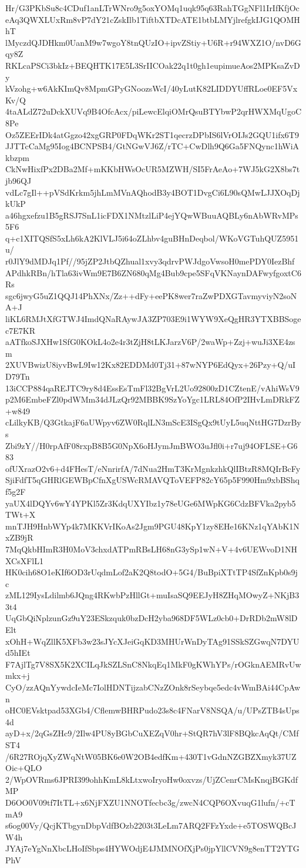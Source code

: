 Hr/G3PKbSu8c4CDuf1anLTrWNro9g5oxYOMq1uqk95q63RahTGgNFl1IrIfKfjOc
eAq3QWXLUxRm8vP7dY21cZskIlb1TiftbXTDcATE1btbLMYjlrefgkIJG1QOMHhT
lMyczdQJDHkm0UanM9w7wgoY8tnQUzIO+ipvZStiy+U6R+r94WXZ1O/nvD6Gqy8Z
RKLcaPSCi3bkIz+BEQHTK17E5L3SrIICOak22q1t0gh1eupimueAos2MPKsaZvDy
kVzohg+w6AkKImQv8MpmGPyGNoozsWcI/40yLutK82LIDDYUffRLoe0EF5VxKv/Q
4taALdZ72uDckXUVq9B4OfcAcx/piLewcElqiOMrQsuBTYbwP2qrHWXMqUgoC8Pe
Oz5ZEErIDk4atGgzo42xgGRP0FDqWKr2ST1qecrzDPbIS6lVrOIJs2GQU1ifx6T9
JJTTcCaMg95Iog4BCNPSB4/GtNGwVJ6Z/rTC+CwDlh9Q6Ga5FNQync1hWiAkbzpm
CkNwHixfPx2DBa2Mf+mKKbHWsOcUR5MZWH/SI5FrAeAo+7WJ5kG2X8bs7tjb96QJ
vdLc7gIl++pVSdKrkm5jhLmMVnAQhodB3y4BOT1DvgCi6L90sQMwLJJXOqDjkUkP
a46hgxefzu1B5gRSJ7SnL1icFDX1NMtzlLiP4ejYQwWBuuAQBLy6nAbWRvMPs5F6
q+c1XITQSfS5xLh6kA2KlVLJ5i64oZLhbv4guBHnDeqbol/WKoVGTuhQUZ5951u/
r0JlY9dMDJq1Pf//95jZP2JtbQZhual1xvy3qdrvPWJdgoVwsoH0mePDY0IezBhf
APdhkRBn/hTla63ivWm9E7B6ZN680qMg4Bub9cpe5SFqVKNaynDAFwyfgoxtC6Rs
sgc6jwyG5uZ1QQJ14PhXNx/Zz++dFy+eePK8wer7raZwPDXGTavmyviyN2soNA+J
liKL6RMJtXfGTWJ4ImdQNaRAywJA3ZP703E9i1WYW9XeQgHR3YTXBBSogec7E7KR
aATfkoSJXHw1SfG0KOkL4o2e4r3tZjH8tLKJarzV6P/2waWp+Zzj+wuJi3XE4zsm
2XUVBwizU8iyvBwL9Iw12Kx82EDDMd0Tj31+87wNYP6EdQyx+26Pzy+Q/uID79Tn
13iCCP884qaREJTC9ry8d4EssEsTmFl32BgVrL2Uo92800zD1CZtenE/vAhiWsV9
p2M6EmbeFZl0pdWMm34dJLzQr92MBBK9SzYoYgc1LRL84OfP2IHvLmDRkFZ+w849
cLilkyKB/Q3GtkajF6aUWpyv6ZW0RqlLN3mScE3ISgQx9tUyL5uqNttHG7DzrBys
Zbi9zY//H0rpAfF08rxpB8B5G0NpX6oHJymJmBWO3uJfl0i+r7uj94OFLSE+G683
ofUXrazO2v6+d4FHesT/eNnrirfA/7dNua2HmT3KrMgnkzhkQlIBtzR8MQIrBcFy
SjiFdfT5qGHRlGEWBpCfnXgUSWcRMAVQToVEFP82cY65p5F990Hm9xbBShqf5g2F
yaUX4lDQYv6wY4YPKl5Zr3KdqUXYIbz1y78eUGe6MWpKG6CdzBFVka2pyb5TWt+X
mnTJH9HnbWYp4k7MKKVrIKoAs2Jgm9PGU48KpY1zy8EHe16KNz1qYAbK1NxZB9jR
7MqQkbHImR3H0MoV3chxdATPmRBsLH68nG3ySp1wN+V+4v6UEWvoD1NHXCsXFlL1
HK0cih68O1eKIf6OD3rUqdmLof2aK2Q8todO+5G4/BuBpiXTtTP4SfZnKpb0s9jc
zML129IysLdilmb6JQng4RKwbPzHllGt+muIsaSQ9EEJyH8ZHqMOwyZ+NKjB33t4
UqGbQiNplzunGz9uY23ESkzquk0bzDcH2yba968DF5WLz0cb0+DrRDb2mW8lDElt
xOhH+WqZllK5XFb3w23sJYcXJeiGqKD3MHUrWnDyTAg91SSkSZGwqN7DYUd5hIEt
F7AjlTg7V8SX5K2XCILqJkSZLSnC8NkqEq1MkF0gKWhYPs/rOGknAEMRvUwmkx+j
CyO/zzAQnYywdcIeMc7IolHDNTijzabCNzZOnk8rSeybqe5edc4vWmBAi44CpAwn
oHC0EVsktpad53XGb4/CflemwBHRPudo23s8c4FNarV8NSQA/u/UPsZTB4sUps4d
ayD+x/2qGsZHc9/2Ilw4PU8yBGbCuXEZqV0hr+StQR7hV3lF8BQkcAqQt/CMfST4
/6R27ROjqXyZWqNtW05BK6e0W2OB4edfKm+430T1vGdnNZGBZXmyk37UZOic+QLO
2/WpOVRms6JPRI399ohhKmL8kLtxwoIryoHw0oxvzs/UjZCenrCMsKnqjBGKdfMP
D6OO0V09tf7ItTL+x6NjFXZU1NNOTfecbc3g/zwcN4CQP6OXvuqG1lufn/+cTmA9
s6og00Vy/QcjKTbgynDbpVdfBOzb2203t3LeLm7ARQ2FFzYxde+e5TOSWQBcJW4h
JYAj7eYgNnXbcLHoIfSbps4HYWOdjE4JMMNOfXjPs0jpYllCVN9g8enTT2YTGPhV

